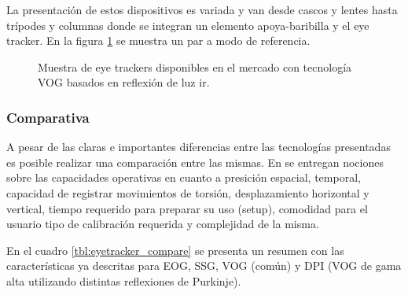 \documentclass[../main.tex]{subfiles}
\begin{document}
\begin{enumerate}
					La presentación de estos dispositivos es variada y van desde cascos y lentes hasta trípodes y columnas donde se integran un elemento apoya-baribilla y el eye tracker. En la figura \ref{fig:02_et_vog2} se muestra un par a modo de referencia. 
					\begin{figure}[H]
						\centering
						\hspace{5mm}
						\caption[Muestra de eye trackers disponibles en el mercado con tecnología VOG basados en reflexión de luz \acrshort{ir}]{Muestra de eye trackers disponibles en el mercado con tecnología VOG basados en reflexión de luz \acrshort{ir}\footnotemark.}
						\label{fig:02_et_vog2}
					\end{figure}

				\end{enumerate}

			\subsubsection{Comparativa}
			\label{ssub:02_comparativa_eyetracker}

				A pesar de las claras e importantes diferencias entre las tecnologías presentadas es posible realizar una comparación entre las mismas. En \cite{article:eyetracker_eggert, article:eyetracker_richardson, dissertation:eyetrackers} se entregan nociones sobre las capacidades operativas en cuanto a presición espacial, temporal, capacidad de registrar movimientos de torsión, desplazamiento horizontal y vertical, tiempo requerido para preparar su uso (setup), comodidad para el usuario tipo de calibración requerida y complejidad de la misma. 

				En el cuadro \ref{tbl:eyetracker_compare} se presenta un resumen con las características ya descritas para EOG, SSG, VOG (común) y DPI (VOG de gama alta utilizando distintas reflexiones de Purkinje). 
				
\end{document}
